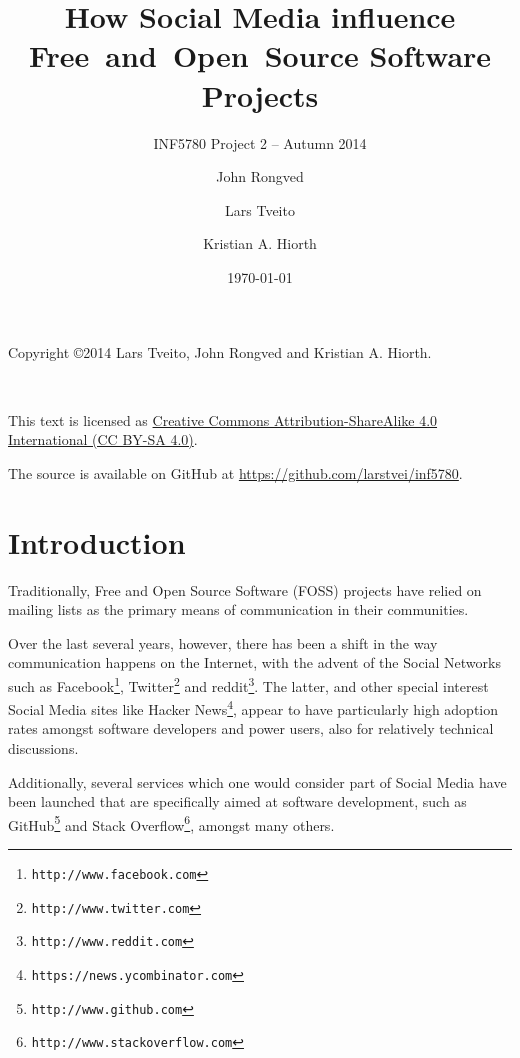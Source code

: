 \documentclass[a4paper,11pt]{article} %
\title{How Social Media influence \hbox{Free and Open Source} Software Projects}
\subtitle{INF5780 Project 2 -- Autumn 2014}
\date{\today}
\author{John Rongved \and Lars Tveito \and Kristian A. Hiorth}
\begin{document}
\ififorside{}

\tableofcontents{}

\vspace{\fill}

\begin{center}
Copyright \copyright 2014 Lars Tveito, John Rongved and Kristian
A. Hiorth.

\ccLogo ~~ \ccAttribution ~~ \ccShareAlike

This text is licensed as \href{http://creativecommons.org/licenses/by-sa/4.0/}{Creative Commons
Attribution-ShareAlike 4.0 International (CC BY-SA 4.0)}.

The source is available on GitHub at
\url{https://github.com/larstvei/inf5780}.

\end{center}
\newpage

\section{Introduction}

Traditionally, Free and Open Source Software (FOSS) projects have
relied on mailing lists as the primary means of communication in
their communities. %

Over the last several years, however, there has been a shift in the way
communication happens on the Internet, with the advent of the Social
Networks such as Facebook\footnote{\texttt{http://www.facebook.com}}, Twitter\footnote{\texttt{http://www.twitter.com}} and reddit\footnote{\texttt{http://www.reddit.com}}.
The latter, and other special
interest Social Media sites like Hacker News\footnote{\texttt{https://news.ycombinator.com}}, appear to have particularly
high adoption rates amongst software developers and power users, also for
relatively technical discussions.

Additionally, several services which one would consider part of Social Media
have been launched that are specifically aimed at software development, such
as GitHub\footnote{\texttt{http://www.github.com}} and Stack Overflow\footnote{\texttt{http://www.stackoverflow.com}}, amongst many others.
\end{document}
